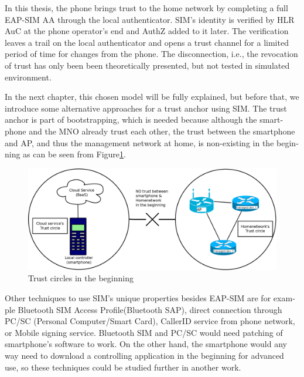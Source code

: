 \documentclass[12pt,a4paper,english]{tutthesis}
\begin{document}
\begin{otherlanguage}{english}
In this thesis,
the phone brings trust to the home network by completing a full EAP-SIM
AA through the local authenticator. SIM's identity is verified by HLR
AuC at the phone operator's end and AuthZ added to it later. The
verification leaves a trail on the local authenticator and opens a
trust channel for a limited period of time for changes from the phone.
The disconnection, i.e., the revocation of trust has only been been theoretically presented,
but not tested in simulated environment.



In the next chapter, this chosen model will be fully explained,
but before that, we introduce some 
alternative approaches for a trust anchor using SIM. The trust anchor
is part of bootstrapping, which is needed because although the
smartphone and the MNO already trust each other, the trust between the
smartphone and AP, and thus the management network at home, is
non-existing in the beginning as can be seen from
Figure\ref{fig:trustbegin}.

\begin{figure}[htb]
\centering
\includegraphics[width=.9\linewidth]{trustcircles.png}
\caption{\label{fig:trustbegin}Trust circles in the beginning}
\end{figure}





Other techniques  to use SIM's unique properties besides EAP-SIM
are for example Bluetooth SIM Access Profile(Bluetooth  SAP), 
direct connection through PC/SC (Personal\- Computer/Smart\- Card),
CallerID service from phone network, or
Mobile signing service.
Bluetooth SIM and PC/SC would need patching of smartphone's software
to work.  On the other hand, the smartphone would any way need to
download  a controlling application
in the beginning for advanced use, so these techniques could be
studied further in another work.


\end{otherlanguage}
\end{document}
